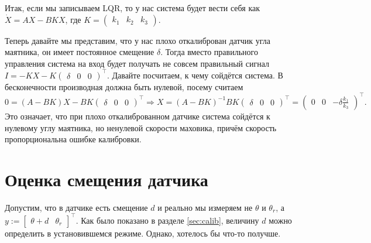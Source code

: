 \documentclass{article}
\begin{document}
Итак, если мы записываем LQR, то у нас система будет вести себя как $\dot X = A X - B K X$, где
$
K= \begin{pmatrix} k_1 & k_2 & k_3 \end{pmatrix}.
$

Теперь давайте мы представим, что у нас плохо откалиброван датчик угла маятника, он имеет постоянное смещение $\delta$. 
Тогда вместо правильного управления система на вход будет получать не совсем правильный сигнал $I=-K X -K \begin{pmatrix} \delta & 0 & 0 \end{pmatrix}^\top$.
Давайте посчитаем, к чему сойдётся система. В бесконечности производная должна быть нулевой, посему считаем
$$
0 = (A-BK)X - BK \begin{pmatrix} \delta & 0 & 0 \end{pmatrix}^\top \Rightarrow X = (A-BK)^{-1}BK\begin{pmatrix} \delta & 0 & 0 \end{pmatrix}^\top = \begin{pmatrix} 0 & 0 & -\delta\frac{k_1}{k_3} \end{pmatrix}^\top.
$$
Это означает, что при плохо откалиброванном датчике система сойдётся к нулевому углу маятника, но ненулевой скорости маховика, причём скорость пропорциональна ошибке калибровки.




\section{Оценка смещения датчика}
Допустим, что в датчике есть смещение $d$ и реально мы измеряем не $\theta$ и $\theta_r$, а $y:=\begin{bmatrix} \theta+d & \theta_r \end{bmatrix}^\top$. Как было показано в разделе \ref{sec:calib}, величину $d$ можно определить в установившемся режиме. Однако, хотелось бы что-то получше. 
\end{document}
